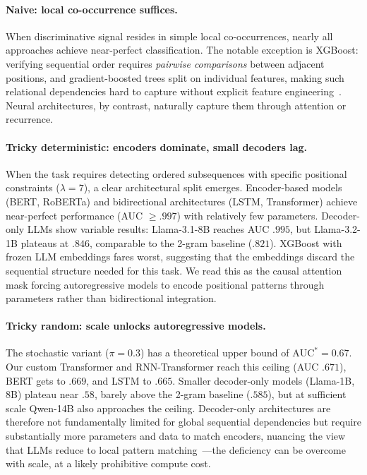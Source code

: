 \documentclass{article}
\theoremstyle{plain}
\theoremstyle{definition}
\theoremstyle{remark}
\begin{document}
\paragraph{Naive: local co-occurrence suffices.}
When discriminative signal resides in simple local co-occurrences, nearly all approaches achieve near-perfect classification. The notable exception is XGBoost: verifying sequential order requires \emph{pairwise comparisons} between adjacent positions, and gradient-boosted trees split on individual features, making such relational dependencies hard to capture without explicit feature engineering~\citep{XGBoostRemember}. Neural architectures, by contrast, naturally capture them through attention or recurrence.

\paragraph{Tricky deterministic: encoders dominate, small decoders lag.}
When the task requires detecting ordered subsequences with specific positional constraints ($\lambda=7$), a clear architectural split emerges. Encoder-based models (BERT, RoBERTa) and bidirectional architectures (LSTM, Transformer) achieve near-perfect performance (AUC $\geq .997$) with relatively few parameters. Decoder-only LLMs show variable results: Llama-3.1-8B reaches AUC $.995$, but Llama-3.2-1B plateaus at $.846$, comparable to the 2-gram baseline ($.821$). XGBoost with frozen LLM embeddings fares worst, suggesting that the embeddings discard the sequential structure needed for this task. We read this as the causal attention mask forcing autoregressive models to encode positional patterns through parameters rather than bidirectional integration.

\paragraph{Tricky random: scale unlocks autoregressive models.}
The stochastic variant ($\pi=0.3$) has a theoretical upper bound of $\mathrm{AUC}^*=0.67$. Our custom Transformer and RNN-Transformer reach this ceiling (AUC $.671$), BERT gets to $.669$, and LSTM to $.665$. Smaller decoder-only models (Llama-1B, 8B) plateau near $.58$, barely above the 2-gram baseline ($.585$), but at sufficient scale Qwen-14B also approaches the ceiling. Decoder-only architectures are therefore not fundamentally limited for global sequential dependencies but require substantially more parameters and data to match encoders, nuancing the view that LLMs reduce to local pattern matching~\citep{nguyen2024understanding,kimLostSequenceLarge2025b}---the deficiency can be overcome with scale, at a likely prohibitive compute cost.
\end{document}
